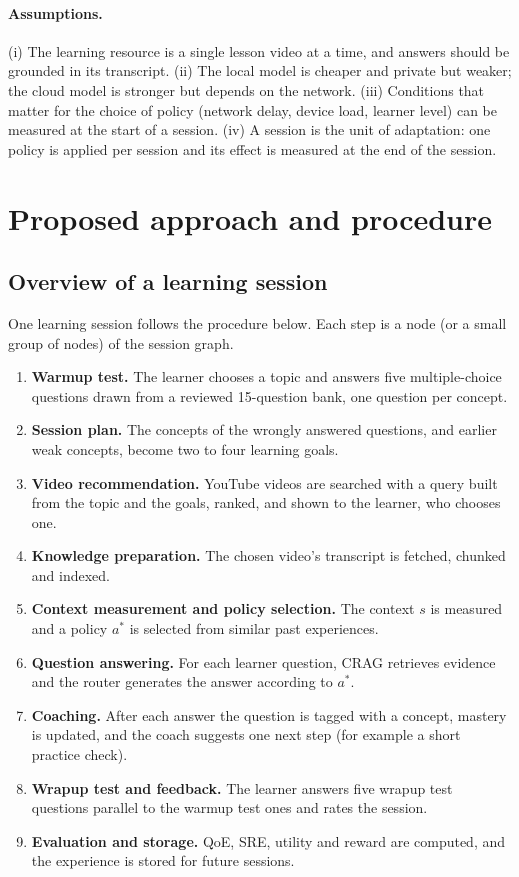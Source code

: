 \paragraph{Assumptions.}
(i) The learning resource is a single lesson video at a time, and answers should be grounded in its transcript.
(ii) The local model is cheaper and private but weaker; the cloud model is stronger but depends on the network.
(iii) Conditions that matter for the choice of policy (network delay, device load, learner level) can be measured at
the start of a session. (iv) A session is the unit of adaptation: one policy is applied per session and its effect is
measured at the end of the session.

\section{Proposed approach and procedure}

\subsection{Overview of a learning session}

One learning session follows the procedure below. Each step is a node (or a small group of nodes) of the session
graph.

\begin{enumerate}
  \item \textbf{Warmup test.} The learner chooses a topic and answers five multiple-choice questions drawn from a reviewed
        15-question bank, one question per concept.
  \item \textbf{Session plan.} The concepts of the wrongly answered questions, and earlier weak concepts, become two to
        four learning goals.
  \item \textbf{Video recommendation.} YouTube videos are searched with a query built from the topic and the goals,
        ranked, and shown to the learner, who chooses one.
  \item \textbf{Knowledge preparation.} The chosen video's transcript is fetched, chunked and indexed.
  \item \textbf{Context measurement and policy selection.} The context $s$ is measured and a policy $a^\ast$ is
        selected from similar past experiences.
  \item \textbf{Question answering.} For each learner question, CRAG retrieves evidence and the router generates the
        answer according to $a^\ast$.
  \item \textbf{Coaching.} After each answer the question is tagged with a concept, mastery is updated, and the coach
        suggests one next step (for example a short practice check).
  \item \textbf{Wrapup test and feedback.} The learner answers five wrapup test questions parallel to the warmup test ones and
        rates the session.
  \item \textbf{Evaluation and storage.} QoE, SRE, utility and reward are computed, and the experience is stored for
        future sessions.
\end{enumerate}

